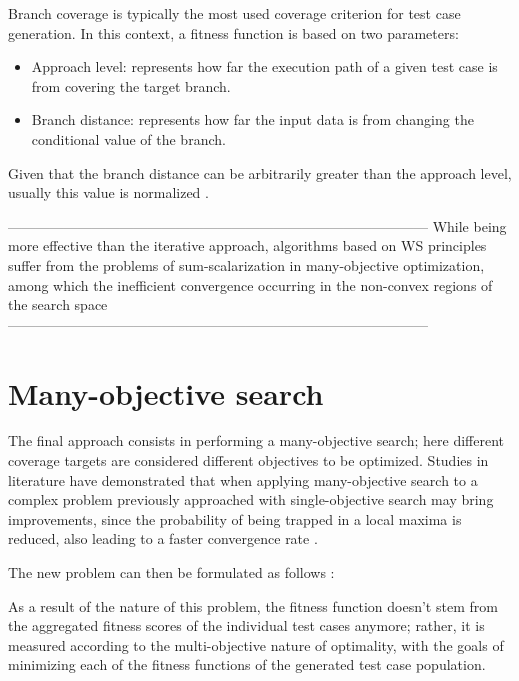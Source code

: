 Branch coverage is typically the most used coverage criterion for test case generation. In this context, a fitness function
is based on two parameters: 
\begin{itemize}
    \item Approach level: represents how far the execution path of a given test case is from covering the target branch.
    \item Branch distance: represents how far the input data is from changing the conditional value of the branch.
\end{itemize}
Given that the branch distance can be arbitrarily greater than the approach level, usually this value is normalized \cite{DBLP:conf/icst/Arcuri10}.

------------------------------------------------------------------------------------------
While being more effective than the iterative approach, algorithms based on WS principles suffer from the problems of sum-scalarization in many-objective optimization, among which the inefficient convergence occurring in the non-convex regions of the search space
------------------------------------------------------------------------------------------

\section{Many-objective search}
The final approach consists in performing a many-objective search; here different coverage targets are considered different objectives to be optimized. 
Studies in literature \cite{DBLP:conf/ppsn/HandlLK08} have demonstrated that when applying many-objective search to a complex problem previously approached with single-objective search may bring improvements, since the probability of being trapped in a local maxima is reduced, also leading to a faster convergence rate \cite{DBLP:conf/icst/PanichellaKT15}.

The new problem can then be formulated as follows \cite{DBLP:journals/tse/PanichellaKT18}:

As a result of the nature of this problem, the fitness function doesn't stem from the aggregated fitness scores of the individual test cases anymore; rather, it is measured according to the multi-objective nature of optimality, with the goals of minimizing each of the fitness functions of the generated test case population.
